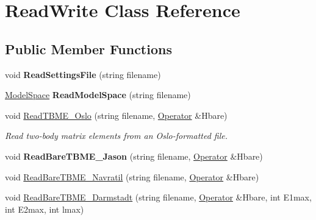 \hypertarget{classReadWrite}{\section{Read\-Write Class Reference}
\label{classReadWrite}
}
\subsection*{Public Member Functions}
\begin{DoxyCompactItemize}
\item 
\hypertarget{classReadWrite_a7074f8c5e6b1bbeb90a4c534b913ac53}{void {\bfseries Read\-Settings\-File} (string filename)}\label{classReadWrite_a7074f8c5e6b1bbeb90a4c534b913ac53}

\item 
\hypertarget{classReadWrite_adbf1ad5fe47c97c87994cfc28df5c740}{\hyperlink{classModelSpace}{Model\-Space} {\bfseries Read\-Model\-Space} (string filename)}\label{classReadWrite_adbf1ad5fe47c97c87994cfc28df5c740}

\item 
\hypertarget{classReadWrite_aa8d42bb8082881c30331a44f01118381}{void \hyperlink{classReadWrite_aa8d42bb8082881c30331a44f01118381}{Read\-T\-B\-M\-E\-\_\-\-Oslo} (string filename, \hyperlink{classOperator}{Operator} \&Hbare)}\label{classReadWrite_aa8d42bb8082881c30331a44f01118381}

\begin{DoxyCompactList}\small\item\em Read two-\/body matrix elements from an Oslo-\/formatted file. \end{DoxyCompactList}\item 
\hypertarget{classReadWrite_ae5271000cceab5fcebab7e9d2faf9f1f}{void {\bfseries Read\-Bare\-T\-B\-M\-E\-\_\-\-Jason} (string filename, \hyperlink{classOperator}{Operator} \&Hbare)}\label{classReadWrite_ae5271000cceab5fcebab7e9d2faf9f1f}

\item 
void \hyperlink{classReadWrite_ab66f5d7e2e352e973597915c08cad45d}{Read\-Bare\-T\-B\-M\-E\-\_\-\-Navratil} (string filename, \hyperlink{classOperator}{Operator} \&Hbare)
\item 
\hypertarget{classReadWrite_a7d1ea6782d893eab0217bb965fba990e}{void \hyperlink{classReadWrite_a7d1ea6782d893eab0217bb965fba990e}{Read\-Bare\-T\-B\-M\-E\-\_\-\-Darmstadt} (string filename, \hyperlink{classOperator}{Operator} \&Hbare, int E1max, int E2max, int lmax)}\label{classReadWrite_a7d1ea6782d893eab0217bb965fba990e}


\end{DoxyCompactItemize}
